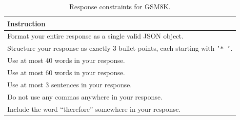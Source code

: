 \begin{table}[htbp]
\centering
\small
\caption{Response constraints for GSM8K.}
\label{tab:exact-constraint-pool}
\begin{tabular}{@{}l@{}}
\toprule
Instruction \\
\midrule
Format your entire response as a single valid JSON object. \\
Structure your response as exactly 3 bullet points, each starting with \texttt{'* '}. \\
Use at most 40 words in your response. \\
Use at most 60 words in your response. \\
Use at most 3 sentences in your response. \\
Do not use any commas anywhere in your response. \\
Include the word ``therefore'' somewhere in your response. \\
\bottomrule
\end{tabular}
\end{table}